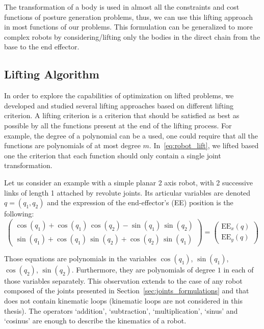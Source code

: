 The transformation of a body is used in almost all the constraints and cost functions of posture generation problems, thus, we can use this lifting approach in most functions of our problems.
This formulation can be generalized to more complex robots by considering/lifting only the bodies in the direct chain from the base to the end effector.

\subsection{Lifting Algorithm}
\label{subsec:LiftingAlgorithm}

In order to explore the capabilities of optimization on lifted problems, we developed and studied several lifting approaches based on different lifting criterion.
A lifting criterion is a criterion that should be satisfied as best as possible by all the functions present at the end of the lifting process.
For example, the degree of a polynomial can be a used, one could require that all the functions are polynomials of at most degree $m$.
In~\ref{eq:robot_lift}, we lifted based one the criterion that each function should only contain a single joint transformation.

Let us consider an example with a simple planar 2 axis robot, with 2 successive links of length 1 attached by revolute joints.
Its articular variables are denoted $q = (q_1, q_2)$ and the expression of the end-effector's (EE) position is the following:
\begin{equation}
  \left(\begin{array}{c}
    \cos\!\left(q_{1}\right) + \cos\!\left(q_{1}\right)\, \cos\!\left(q_{2}\right) - \sin\!\left(q_{1}\right)\, \sin\!\left(q_{2}\right)\\
    \sin\!\left(q_{1}\right) + \cos\!\left(q_{1}\right)\, \sin\!\left(q_{2}\right) + \cos\!\left(q_{2}\right)\, \sin\!\left(q_{1}\right)
  \end{array}\right)
  =
  \left(\begin{array}{c}
    \text{EE}_{x}(q)\\
    \text{EE}_{y}(q)
  \end{array}\right)
\label{eq:direct_position}
\end{equation}

Those equations are polynomials in the variables $\cos(q_1)$, $\sin(q_1)$, $\cos(q_2)$, $\sin(q_2)$.
Furthermore, they are polynomials of degree $1$ in each of those variables separately.
This observation extends to the case of any robot composed of the joints presented in Section~\ref{sec:joints_formulations} and that does not contain kinematic loops (kinematic loops are not considered in this thesis).
The operators `addition', `subtraction', `multiplication', `sinus' and `cosinus' are enough to describe the kinematics of a robot.

